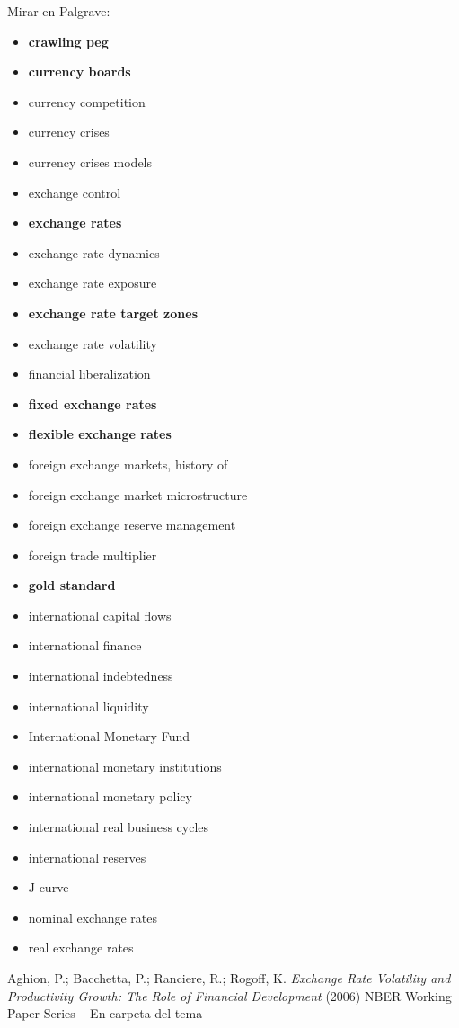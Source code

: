 \documentclass{nuevotema}
\begin{document}
Mirar en Palgrave:
\begin{itemize}
	\item \textbf{crawling peg}
	\item \textbf{currency boards}
	\item currency competition
	\item currency crises
	\item currency crises models
	\item exchange control
	\item \textbf{exchange rates}
	\item exchange rate dynamics
	\item exchange rate exposure
	\item \textbf{exchange rate target zones}
	\item exchange rate volatility
	\item financial liberalization
	\item \textbf{fixed exchange rates}
	\item \textbf{flexible exchange rates}
	\item foreign exchange markets, history of
	\item foreign exchange market microstructure
	\item foreign exchange reserve management
	\item foreign trade multiplier
	\item \textbf{gold standard}
	\item international capital flows
	\item international finance
	\item international indebtedness
	\item international liquidity
	\item International Monetary Fund
	\item international monetary institutions
	\item international monetary policy
	\item international real business cycles
	\item international reserves
	\item J-curve
	\item nominal exchange rates
	\item real exchange rates
\end{itemize}

Aghion, P.; Bacchetta, P.; Ranciere, R.; Rogoff, K. \textit{Exchange Rate Volatility and Productivity Growth: The Role of Financial Development} (2006) NBER Working Paper Series -- En carpeta del tema
\end{document}
